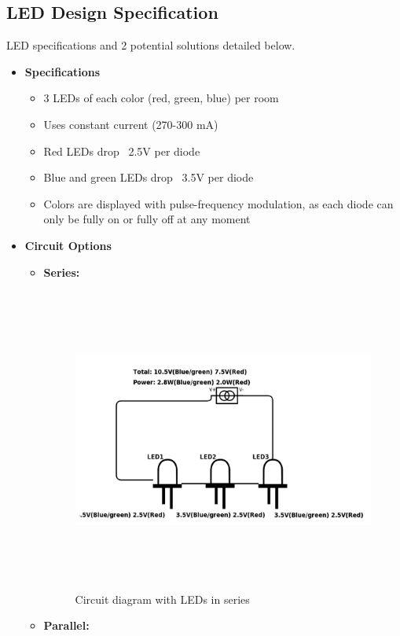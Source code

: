 \documentclass[12pt]{article}
\begin{document}
{	\subsection{LED Design Specification}
	LED specifications and 2 potential solutions detailed below.
	
		{\renewcommand\labelitemi{}
			\begin{itemize}
				\item \textbf{Specifications}
					\begin{itemize}
						\item 3 LEDs of each color (red, green, blue) per room
						\item Uses constant current (270-300 mA)
						\item Red LEDs drop ~2.5V per diode
						\item Blue and green LEDs drop ~3.5V per diode
						\item Colors are displayed with pulse-frequency modulation, as each diode can only be fully on or fully off at any moment
					\end{itemize}
				\item \textbf{Circuit Options}
					\begin{itemize}
						\item \textbf{Series:}
							\begin{figure}[!htb]
								\centering
								\includegraphics[height = 100mm]{assets/SeriesLED.jpg}
								\caption{Circuit diagram with LEDs in series \label{overflow}}
							\end{figure}
						\item \textbf{Parallel:}

\end{itemize}
\end{itemize}}}
\end{document}
